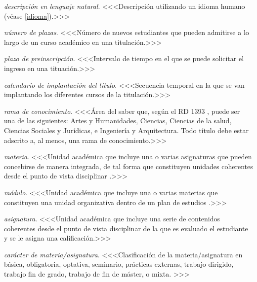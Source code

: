     \item \emph{descripción en lenguaje natural}. <<<Descripción utilizando un idioma humano (véase \ref{idioma}).>>>

    \item \emph{número de plazas}. <<<Número de nuevos estudiantes que pueden
        admitirse a lo largo de un curso académico en una titulación.>>>

    \item \emph{plazo de preinscripción}. <<<Intervalo de tiempo en el que se
        puede solicitar el ingreso en una tituación.>>>

    \item \emph{calendario de implantación del título}. <<<Secuencia temporal en la
        que se van implantando los diferentes cursos de la
        titulación\cite[página 62]{guiaAneca}.>>>

    \item \emph{rama de conocimiento}. <<<Área del saber que, según el RD 1393
        \cite[artículo 12, apartado 4]{rd1393}, puede ser una de las siguientes:
        Artes y Humanidades, Ciencias, Ciencias de la salud, Ciencias Sociales
        y Jurídicas, e Ingeniería y Arquitectura. Todo título debe estar
        adscrito a, al menos, una rama de conocimiento.>>>

    \item \emph{materia}. <<<Unidad académica que incluye una o varias asignaturas que
        pueden concebirse de manera integrada, de tal forma que constituyen
        unidades coherentes desde el punto de vista disciplinar \cite[página
        33]{guiaAneca}.>>>

    \item \emph{módulo}. <<<Unidad académica que incluye una o varias materias que
        constituyen una unidad organizativa dentro de un plan de estudios
        \cite[página 33]{guiaAneca}.>>>

    \item \emph{asignatura}. <<<Unidad académica que incluye una serie de
        contenidos coherentes desde el punto de vista disciplinar de la que es
        evaluado el estudiante y se le asigna una calificación.>>>

    \item \emph{carácter de materia/asignatura}. <<<Clasificación de la materia/asignatura en
        básica, obligatoria, optativa, seminario, prácticas externas,
        trabajo dirigido, trabajo fin de grado, trabajo de fin de máster, o
        mixta.\cite[artículo 12, apartado 2]{rd1393} \cite[sección
        D.5]{guiaMadridMasD}>>>

